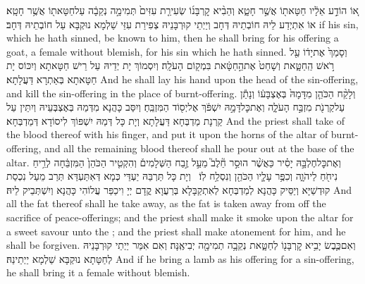 {א֚וֹ הוֹדַ֣ע אֵלָ֔יו חַטָּאת֖וֹ אֲשֶׁ֣ר חָטָ֑א וְהֵבִ֨יא קׇרְבָּנ֜וֹ שְׂעִירַ֤ת עִזִּים֙ תְּמִימָ֣ה נְקֵבָ֔ה עַל\maqqaf חַטָּאת֖וֹ אֲשֶׁ֥ר חָטָֽא׃}
{אוֹ אִתְיְדַע לֵיהּ חוֹבְתֵיהּ דְּחָב וְיַיְתֵי קוּרְבָּנֵיהּ צְפִירַת עִזֵּי שַׁלְמָא נוּקְבָּא עַל חוֹבְתֵיהּ דְּחָב׃}
{if his sin, which he hath sinned, be known to him, then he shall bring for his offering a goat, a female without blemish, for his sin which he hath sinned.}{}
{וְסָמַךְ֙ אֶת\maqqaf יָד֔וֹ עַ֖ל רֹ֣אשׁ הַֽחַטָּ֑את וְשָׁחַט֙ אֶת\maqqaf הַ֣חַטָּ֔את בִּמְק֖וֹם הָעֹלָֽה׃}
{וְיִסְמוֹךְ יָת יְדֵיהּ עַל רֵישׁ חַטָּאתָא וְיִכּוֹס יָת חַטָּאתָא בְּאַתְרָא דַּעֲלָתָא׃}
{And he shall lay his hand upon the head of the sin-offering, and kill the sin-offering in the place of burnt-offering.}{}
{וְלָקַ֨ח הַכֹּהֵ֤ן מִדָּמָהּ֙ בְּאֶצְבָּע֔וֹ וְנָתַ֕ן עַל\maqqaf קַרְנֹ֖ת מִזְבַּ֣ח הָעֹלָ֑ה וְאֶת\maqqaf כׇּל\maqqaf דָּמָ֣הּ יִשְׁפֹּ֔ךְ אֶל\maqqaf יְס֖וֹד הַמִּזְבֵּֽחַ׃}
{וְיִסַּב כָּהֲנָא מִדְּמַהּ בְּאֶצְבְּעֵיהּ וְיִתֵּין עַל קַרְנָת מַדְבְּחָא דַּעֲלָתָא וְיָת כָּל דְּמַהּ יִשְׁפּוֹךְ לִיסוֹדָא דְּמַדְבְּחָא׃}
{And the priest shall take of the blood thereof with his finger, and put it upon the horns of the altar of burnt-offering, and all the remaining blood thereof shall he pour out at the base of the altar.}{}
{וְאֶת\maqqaf כׇּל\maqqaf חֶלְבָּ֣הּ יָסִ֗יר כַּאֲשֶׁ֨ר הוּסַ֣ר חֵ֘לֶב֮ מֵעַ֣ל זֶ֣בַח הַשְּׁלָמִים֒ וְהִקְטִ֤יר הַכֹּהֵן֙ הַמִּזְבֵּ֔חָה לְרֵ֥יחַ נִיחֹ֖חַ לַיהֹוָ֑ה וְכִפֶּ֥ר עָלָ֛יו הַכֹּהֵ֖ן וְנִסְלַ֥ח לֽוֹ׃ \petucha }
{וְיָת כָּל תַּרְבַּהּ יַעְדֵּי כְּמָא דְּאִתַּעְדַּא תְּרַב מֵעַל נִכְסַת קוּדְשַׁיָּא וְיַסֵּיק כָּהֲנָא לְמַדְבְּחָא לְאִתְקַבָּלָא בְּרַעֲוָא קֳדָם יְיָ וִיכַפַּר עֲלוֹהִי כָּהֲנָא וְיִשְׁתְּבֵיק לֵיהּ׃}
{And all the fat thereof shall he take away, as the fat is taken away from off the sacrifice of peace-offerings; and the priest shall make it smoke upon the altar for a sweet savour unto the \lord; and the priest shall make atonement for him, and he shall be forgiven.}{}
{וְאִם\maqqaf כֶּ֛בֶשׂ יָבִ֥יא קׇרְבָּנ֖וֹ לְחַטָּ֑את נְקֵבָ֥ה תְמִימָ֖ה יְבִיאֶֽנָּה׃}
{וְאִם אִמַּר יַיְתֵי קוּרְבָּנֵיהּ לְחַטָּתָא נוּקְבָּא שַׁלְמָא יַיְתֵינַהּ׃}
{And if he bring a lamb as his offering for a sin-offering, he shall bring it a female without blemish.}{}
